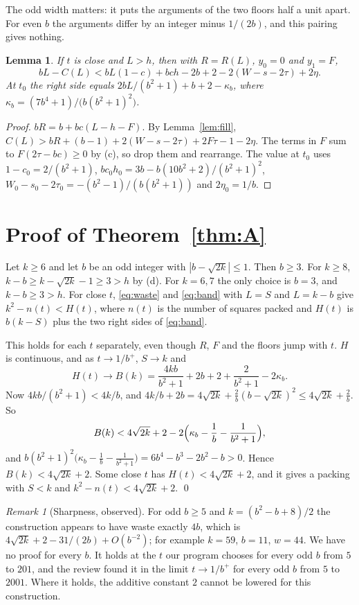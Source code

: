 \documentclass[11pt,letterpaper]{amsart}
\theoremstyle{plain}
\newtheorem{lemma}[theorem]{Lemma}
\theoremstyle{remark}
\newtheorem*{remark}{Remark}
\begin{document}
The odd width matters: it puts the arguments of the two floors half a unit apart. For even $b$ the arguments differ by an integer minus $1/(2b)$, and this pairing gives nothing.

\begin{lemma}\label{lem:band}
If $t$ is close and $L>h$, then with $R=R(L)$, $y_0=0$ and $y_1=F$,
\begin{equation}\label{eq:band}
bL-C(L)<bL(1-c)+bch-2b+2-2(W-s-2\tau)+2\eta.
\end{equation}
At $t_0$ the right side equals $2bL/(b^2+1)+b+2-\kappa_b$, where $\kappa_b=(7b^4+1)/\bigl(b(b^2+1)^2\bigr)$.
\end{lemma}

\begin{proof}
$bR=b+bc(L-h-F)$. By Lemma~\ref{lem:fill}, $C(L)>bR+(b-1)+2(W-s-2\tau)+2F\tau-1-2\eta$. The terms in $F$ sum to $F(2\tau-bc)\ge0$ by (c), so drop them and rearrange. The value at $t_0$ uses $1-c_0=2/(b^2+1)$, $bc_0h_0=3b-b(10b^2+2)/(b^2+1)^2$, $W_0-s_0-2\tau_0=-(b^2-1)/(b(b^2+1))$ and $2\eta_0=1/b$.
\end{proof}

\section{Proof of Theorem~\ref{thm:A}}

Let $k\ge6$ and let $b$ be an odd integer with $|b-\sqrt{2k}|\le1$. Then $b\ge3$. For $k\ge8$, $k-b\ge k-\sqrt{2k}-1\ge3>h$ by (d). For $k=6,7$ the only choice is $b=3$, and $k-b\ge3>h$. For close $t$, \eqref{eq:waste} and \eqref{eq:band} with $L=S$ and $L=k-b$ give $k^2-n(t)<H(t)$, where $n(t)$ is the number of squares packed and $H(t)$ is $b(k-S)$ plus the two right sides of \eqref{eq:band}.

This holds for each $t$ separately, even though $R$, $F$ and the floors jump with $t$. $H$ is continuous, and as $t\to1/b^+$, $S\to k$ and
\[
H(t)\to B(k)=\frac{4kb}{b^2+1}+2b+2+\frac{2}{b^2+1}-2\kappa_b.
\]
Now $4kb/(b^2+1)<4k/b$, and $4k/b+2b=4\sqrt{2k}+\frac2b(b-\sqrt{2k})^2\le4\sqrt{2k}+\frac2b$. So
\[
B(k)<4\sqrt{2k}+2-2\Bigl(\kappa_b-\frac1b-\frac1{b^2+1}\Bigr),
\]
and $b(b^2+1)^2\bigl(\kappa_b-\frac1b-\frac1{b^2+1}\bigr)=6b^4-b^3-2b^2-b>0$. Hence $B(k)<4\sqrt{2k}+2$. Some close $t$ has $H(t)<4\sqrt{2k}+2$, and it gives a packing with $S<k$ and $k^2-n(t)<4\sqrt{2k}+2$. \qed

\begin{remark}[Sharpness, observed]
For odd $b\ge5$ and $k=(b^2-b+8)/2$ the construction appears to have waste exactly $4b$, which is $4\sqrt{2k}+2-31/(2b)+O(b^{-2})$; for example $k=59$, $b=11$, $w=44$. We have no proof for every $b$. It holds at the $t$ our program chooses for every odd $b$ from $5$ to $201$, and the review \cite{Lev26} found it in the limit $t\to1/b^+$ for every odd $b$ from $5$ to $2001$. Where it holds, the additive constant $2$ cannot be lowered for this construction.
\end{remark}
\end{document}
